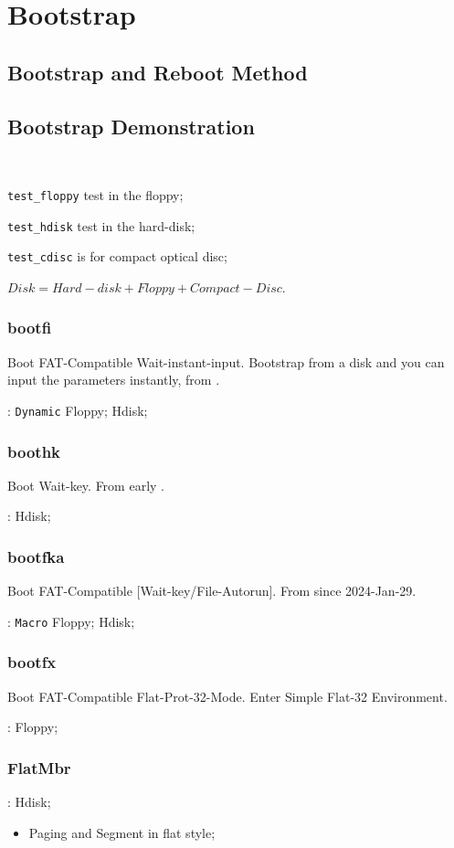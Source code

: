 
\section{Bootstrap}

\subsection{Bootstrap and Reboot Method}


\subsection{Bootstrap Demonstration} \

\verb`test_floppy` test in the floppy;

\verb`test_hdisk` test in the hard-disk;

\verb`test_cdisc` is  for compact optical disc;

$Disk = Hard-disk + Floppy + Compact-Disc$.

\subsubsection{bootfi}

Boot FAT-Compatible Wait-instant-input. Bootstrap from a disk and you can input the parameters instantly, from .

: \verb|Dynamic| Floppy; Hdisk;

\subsubsection{boothk}

Boot Wait-key. From early .

: Hdisk;

\subsubsection{bootfka}

Boot FAT-Compatible [Wait-key/File-Autorun]. From  since 2024-Jan-29.

: \verb`Macro` Floppy; Hdisk;

\subsubsection{bootfx}

Boot FAT-Compatible Flat-Prot-32-Mode. Enter Simple Flat-32 Environment.

: Floppy;

\subsubsection{FlatMbr}


: Hdisk;

\begin{itemize}
	\item Paging and Segment in flat style;
\end{itemize}
